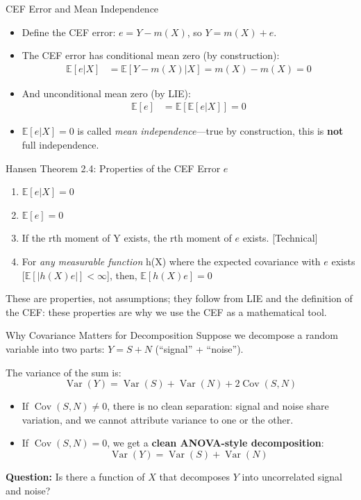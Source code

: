 \documentclass[aspectratio=169, handout, t]{beamer}
\numberwithin{equation}{section}
\begin{document}
\begin{frame}{CEF Error and Mean Independence}
\begin{itemize}
\item Define the CEF error: $e=Y-m(X)$, so $Y=m(X)+e$.
\item The CEF error has conditional mean zero (by construction):
\begin{align*}
\mathbb{E}[e|X]&=\mathbb{E}[Y-m(X)|X]=m(X)-m(X)=0
\end{align*}
\item And unconditional mean zero (by LIE):
\begin{align*}
\mathbb{E}[e]&=\mathbb{E}[\mathbb{E}[e|X]]=0
\end{align*}
\item $\mathbb{E}[e|X]=0$ is called \emph{mean independence}---true by construction, this is \textbf{not} full independence.
\end{itemize}
\end{frame}


\begin{frame}{Hansen Theorem 2.4: Properties of the CEF Error $e$}
\begin{enumerate}
\item $\mathbb{E}[e|X]=0$
\item $\mathbb{E}[e]=0$
\item If the rth moment of Y exists, the rth moment of $e$ exists. [Technical]
\item For \emph{any measurable function} h(X) where the expected covariance with $e$ exists [$\mathbb{E}[|h(X)e|]< \infty$], then, $\mathbb{E}[h(X)e]=0$
\end{enumerate}
\bigskip

\begin{tcolorbox}[colback=blue!5, colframe=blue!50, title=Key Point]
These are properties, not assumptions; they follow from LIE and the definition of the CEF: \alert{these properties are why we use the CEF as a mathematical tool.}
\end{tcolorbox}
\end{frame}



\begin{frame}{Why Covariance Matters for Decomposition}
Suppose we decompose a random variable into two parts: $Y = S + N$ (``signal'' + ``noise'').
\pause
\medskip

The variance of the sum is:
$$\operatorname{Var}(Y)=\operatorname{Var}(S)+\operatorname{Var}(N)+2\operatorname{Cov}(S,N)$$
\pause
\begin{itemize}
\item If $\operatorname{Cov}(S,N)\neq 0$, there is no clean separation: signal and noise share variation, and we cannot attribute variance to one or the other.
\pause
\item If $\operatorname{Cov}(S,N)= 0$, we get a \textbf{clean ANOVA-style decomposition}:
$$\operatorname{Var}(Y)=\operatorname{Var}(S)+\operatorname{Var}(N)$$
\end{itemize}
\pause
\medskip
\textbf{Question:} Is there a function of $X$ that decomposes $Y$ into uncorrelated signal and noise?
\end{frame}
\end{document}
